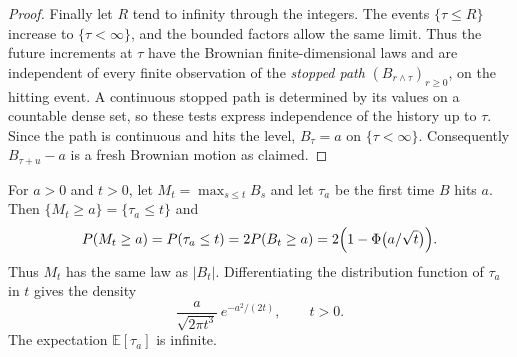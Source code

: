 \begin{proof}
Finally let $R$ tend to infinity through the integers. The events $\{\tau\le R\}$ increase to $\{\tau<\infty\}$, and the bounded factors allow the same limit. Thus the future increments at $\tau$ have the Brownian finite-dimensional laws and are independent of every finite observation of the \emph{stopped path} $(B_{r\wedge\tau})_{r\ge0}$, on the hitting event. A continuous stopped path is determined by its values on a countable dense set, so these tests express independence of the history up to $\tau$. Since the path is continuous and hits the level, $B_\tau=a$ on $\{\tau<\infty\}$. Consequently $B_{\tau+u}-a$ is a fresh Brownian motion as claimed.
\end{proof}

\begin{theorem}[reflection]\label{thm:reflection}
For $a>0$ and $t>0$, let $M_t=\max_{s\le t}B_s$ and let $\tau_a$ be the first time $B$ hits $a$. Then $\{M_t\ge a\}=\{\tau_a\le t\}$ and
\[
 P(M_t\ge a)=P(\tau_a\le t)=2P(B_t\ge a)=2\Bigl(1-\Phi\bigl(a/\sqrt t\bigr)\Bigr).
\]
Thus $M_t$ has the same law as $|B_t|$. Differentiating the distribution function of $\tau_a$ in $t$ gives the density
\[
 \frac{a}{\sqrt{2\pi t^3}}\,e^{-a^2/(2t)},\qquad t>0.
\]
The expectation $\mathbb E[\tau_a]$ is infinite.
\end{theorem}

